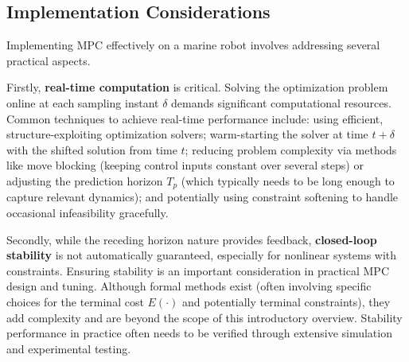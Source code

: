 \subsection{Implementation Considerations}
Implementing MPC effectively on a marine robot involves addressing several practical aspects.

Firstly, \textbf{real-time computation} is critical. Solving the optimization problem online at each sampling instant $\delta$ demands significant computational resources. Common techniques to achieve real-time performance include: using efficient, structure-exploiting optimization solvers; warm-starting the solver at time $t+\delta$ with the shifted solution from time $t$; reducing problem complexity via methods like move blocking (keeping control inputs constant over several steps) or adjusting the prediction horizon $T_p$ (which typically needs to be long enough to capture relevant dynamics); and potentially using constraint softening to handle occasional infeasibility gracefully.

Secondly, while the receding horizon nature provides feedback, \textbf{closed-loop stability} is not automatically guaranteed, especially for nonlinear systems with constraints. Ensuring stability is an important consideration in practical MPC design and tuning. Although formal methods exist (often involving specific choices for the terminal cost $E(\cdot)$ and potentially terminal constraints), they add complexity and are beyond the scope of this introductory overview. Stability performance in practice often needs to be verified through extensive simulation and experimental testing.




